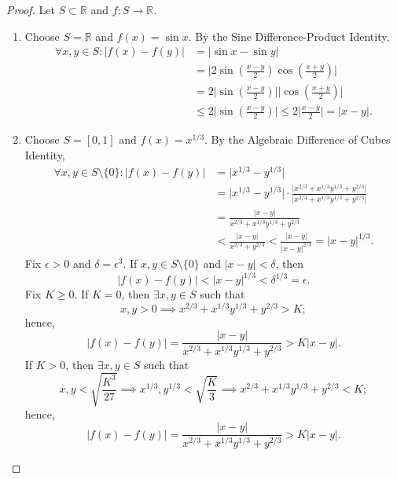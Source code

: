 \documentclass[12pt]{article}
\theoremstyle{definition}
\begin{document}
\begin{proof}
    Let \(S \subset \mathbb{R}\) and \(f : S \to \mathbb{R}\).
    \begin{enumerate}[label=(\alph*)]
        \item Choose \(S = \mathbb{R}\) and \(f(x) = \sin x\). By the Sine Difference-Product Identity, 
        \begin{align*}
            \forall x,y \in S : \vert f(x) - f(y) \vert &= \vert \sin x - \sin y \vert \\
            &= \bigg\vert 2\sin\left(\frac{x - y}{2}\right)\cos\left(\frac{x + y}{2}\right) \bigg\vert \\
            &= 2 \bigg\vert \sin\left(\frac{x - y}{2}\right) \bigg\vert \bigg\vert \cos\left(\frac{x + y}{2}\right) \bigg\vert \\
            &\leq 2 \bigg\vert \sin\left(\frac{x - y}{2}\right) \bigg\vert \leq 2 \bigg\vert \frac{x - y}{2} \bigg\vert = \vert x - y \vert.
        \end{align*}
        \item Choose \(S = [0, 1]\) and \(f(x) = x^{1 / 3}\). By the Algebraic Difference of Cubes Identity, 
        \begin{align*}
            \forall x,y \in S \setminus \{0\} : \vert f(x) - f(y) \vert &= \vert x^{1 / 3} - y^{1 / 3} \vert \\
            &= \vert x^{1 / 3} - y^{1 / 3} \vert \cdot \frac{\vert x^{2 / 3} + x^{1 / 3}y^{1 / 3} + y^{2 / 3} \vert}{\vert x^{2 / 3} + x^{1 / 3}y^{1 / 3} + y^{2 / 3} \vert} \\
            &= \frac{\vert x - y \vert}{x^{2 / 3} + x^{1 / 3}y^{1 / 3} + y^{2 / 3}} \\
            &< \frac{\vert x - y \vert}{x^{2 / 3} + y^{2 / 3}} < \frac{\vert x - y \vert}{\vert x - y \vert^{2 / 3}} = \vert x - y \vert^{1 / 3}.
        \end{align*}
        Fix \(\epsilon > 0\) and \(\delta = \epsilon^3\). If \(x, y \in S \setminus \{0\}\) and \(\vert x - y \vert < \delta\), then
        \[
            \vert f(x) - f(y) \vert < \vert x - y \vert^{1 / 3} < \delta^{1 / 3} = \epsilon.
        \]
        Fix \(K \geq 0\). If \(K = 0\), then \(\exists x,y \in S\) such that
        \[
            x,y > 0 \implies x^{2 / 3} + x^{1 / 3}y^{1 / 3} + y^{2 / 3} > K;
        \]
        hence,
        \[
            \vert f(x) - f(y) \vert = \frac{\vert x - y \vert}{x^{2 / 3} + x^{1 / 3}y^{1 / 3} + y^{2 / 3}} > K \vert x - y \vert.
        \]
        If \(K > 0\), then \(\exists x,y \in S\) such that
        \[
            x,y < \sqrt{\frac{K^3}{27}} \implies x^{1 / 3},y^{1 / 3} < \sqrt{\frac{K}{3}} \implies x^{2 / 3} + x^{1 / 3}y^{1 / 3} + y^{2 / 3} < K;
        \]
        hence,
        \[
            \vert f(x) - f(y) \vert = \frac{\vert x - y \vert}{x^{2 / 3} + x^{1 / 3}y^{1 / 3} + y^{2 / 3}} > K \vert x - y \vert.
        \]
    \end{enumerate}
\end{proof}
\end{document}

